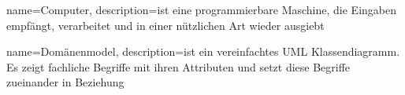 \glsaddall
\printglossaries


{
	name=Computer,
	description={ist eine programmierbare Maschine, die Eingaben empfängt, verarbeitet und in einer nützlichen Art wieder ausgiebt}
}

{
	name=Domänenmodel,
	description={ist ein vereinfachtes \ac{UML} Klassendiagramm. Es zeigt fachliche Begriffe mit ihren Attributen und setzt diese Begriffe zueinander in Beziehung}
}




